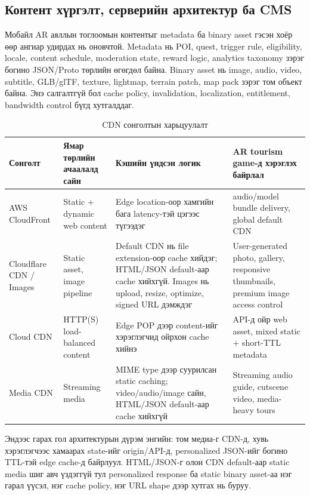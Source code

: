 \begin{sloppy}
\section*{Контент хүргэлт, серверийн архитектур ба CMS}

Мобайл AR аяллын тоглоомын контентыг metadata ба binary asset гэсэн хоёр өөр ангиар удирдах нь оновчтой. Metadata нь POI, quest, trigger rule, eligibility, locale, content schedule, moderation state, reward logic, analytics taxonomy зэрэг богино JSON/Proto төрлийн өгөгдөл байна. Binary asset нь image, audio, video, subtitle, GLB/glTF, texture, lightmap, terrain patch, map pack зэрэг том объект байна. Энэ салгалтгүй бол cache policy, invalidation, localization, entitlement, bandwidth control бүгд хутгалддаг.

\begin{table}[H]
\centering
\caption{CDN сонголтын харьцуулалт}
\label{tab:cdn-comparison}
\small
\begin{tabular}{|p{2.5cm}|p{3cm}|p{3.5cm}|p{3.5cm}|}
\hline
\textbf{Сонголт} & \textbf{Ямар төрлийн ачаалалд сайн} & \textbf{Кэшийн үндсэн логик} & \textbf{AR tourism game-д хэрэглэх байрлал} \\ \hline
AWS CloudFront & Static + dynamic web content & Edge location-оор хамгийн бага latency-тэй цэгээс түгээдэг & audio/model bundle delivery, global default CDN \\ \hline
Cloudflare CDN / Images & Static asset, image pipeline & Default CDN нь file extension-оор cache хийдэг; HTML/JSON default-аар cache хийхгүй. Images нь upload, resize, optimize, signed URL дэмждэг & User-generated photo, gallery, responsive thumbnails, premium image access control \\ \hline
Cloud CDN & HTTP(S) load-balanced content & Edge POP дээр content-ийг хэрэглэгчид ойрхон cache хийнэ & API-д ойр web asset, mixed static + short-TTL metadata \\ \hline
Media CDN & Streaming media & MIME type дээр суурилсан static caching; video/audio/image сайн, HTML/JSON default-аар cache хийхгүй & Streaming audio guide, cutscene video, media-heavy tours \\ \hline
\end{tabular}
\end{table}

Эндээс гарах гол архитектурын дүрэм энгийн: том медиа-г CDN-д, хувь хэрэглэгчээс хамаарах state-ийг origin/API-д, personalized JSON-ийг богино TTL-тэй edge cache-д байрлуул. HTML/JSON-г олон CDN default-аар static media шиг авч үздэггүй тул personalized response ба static binary asset-аа нэг гарал үүсэл, нэг cache policy, нэг URL shape дээр хутгах нь буруу.


\end{sloppy}
